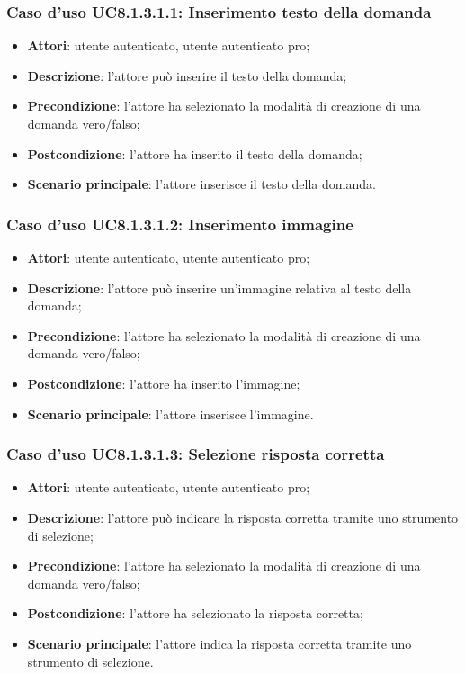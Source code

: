 \subsubsection{Caso d'uso UC8.1.3.1.1: Inserimento testo della domanda}
	\begin{itemize}
		\item
			\textbf{Attori}: utente autenticato, utente autenticato pro;
		\item		
			\textbf{Descrizione}: l'attore può inserire il testo della domanda;
		\item
			\textbf{Precondizione}: l'attore ha selezionato la modalità di creazione di una domanda vero/falso; 
		\item
			\textbf{Postcondizione}: l'attore ha inserito il testo della domanda;
		\item
			\textbf{Scenario principale}: l'attore inserisce il testo della domanda. 
	 			
	\end{itemize}
	
\subsubsection{Caso d'uso UC8.1.3.1.2: Inserimento immagine}
	\begin{itemize}
		\item
			\textbf{Attori}: utente autenticato, utente autenticato pro;
		\item		
			\textbf{Descrizione}: l'attore può inserire un'immagine relativa al testo della domanda;
		\item
			\textbf{Precondizione}: l'attore ha selezionato la modalità di creazione di una domanda vero/falso; 
		\item
			\textbf{Postcondizione}: l'attore ha inserito l'immagine;
		\item
			\textbf{Scenario principale}: l'attore inserisce l'immagine. 	
	\end{itemize}
	

\subsubsection{Caso d'uso UC8.1.3.1.3: Selezione risposta corretta}
	\begin{itemize}
		\item
			\textbf{Attori}: utente autenticato, utente autenticato pro;
		\item		
			\textbf{Descrizione}: l'attore può indicare la risposta corretta tramite uno strumento di selezione;
		\item
			\textbf{Precondizione}: l'attore ha selezionato la modalità di creazione di una domanda vero/falso; 
		\item
			\textbf{Postcondizione}: l'attore ha selezionato la risposta corretta;
		\item
			\textbf{Scenario principale}: l'attore indica la risposta corretta tramite uno strumento di selezione. 
	 			
	\end{itemize}
	

	
